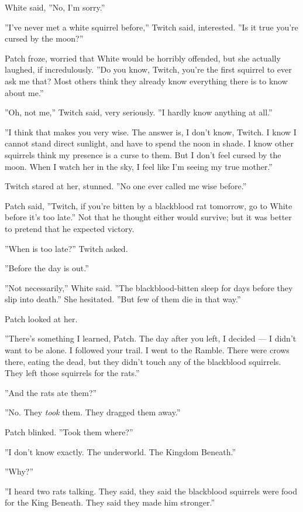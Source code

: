 \documentclass[12pt]{book}
\begin{document}
White said, ''No, I'm sorry.''

''I've never met a white squirrel before,'' Twitch said,
interested. ''Is it true you're cursed by the moon?''

Patch froze, worried that White would be horribly offended, but she
actually laughed, if incredulously. ''Do you know, Twitch, you're the
first squirrel to ever ask me that? Most others think they already
know everything there is to know about me.''

''Oh, not me,'' Twitch said, very seriously. ''I hardly know anything
at all.''

''I think that makes you very wise. The answer is, I don't know,
Twitch. I know I cannot stand direct sunlight, and have to spend the
noon in shade. I know other squirrels think my presence is a curse to
them. But I don't feel cursed by the moon. When I watch her in the
sky, I feel like I'm seeing my true mother.''

Twitch stared at her, stunned. ''No one ever called me wise before.''

Patch said, ''Twitch, if you're bitten by a blackblood rat tomorrow,
go to White before it's too late.'' Not that he thought either would
survive; but it was better to pretend that he expected victory.

''When is too late?'' Twitch asked.

''Before the day is out.''

''Not necessarily,'' White said. ''The blackblood-bitten sleep for
days before they slip into death.'' She hesitated. ''But few of them
die in that way.''

Patch looked at her.

''There's something I learned, Patch. The day after you left, I
decided --- I didn't want to be alone. I followed your trail. I went
to the Ramble. There were crows there, eating the dead, but they
didn't touch any of the blackblood squirrels. They left those
squirrels for the rats.''

''And the rats ate them?''

''No. They \textit{took} them. They dragged them away.''

Patch blinked. ''Took them where?''

''I don't know exactly. The underworld. The Kingdom Beneath.''

''Why?''

''I heard two rats talking. They said, they said the blackblood
squirrels were food for the King Beneath. They said they made him
stronger.''
\end{document}
